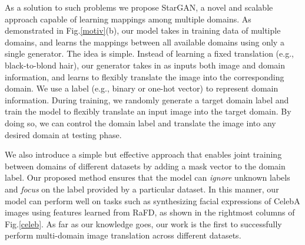 \documentclass[10pt,twocolumn,letterpaper]{article}
\begin{document}

As a solution to such problems we propose StarGAN, a novel and scalable approach capable of learning mappings among multiple domains. As demonstrated in Fig.\thinspace\ref{motiv}\thinspace(b), our model takes in training data of multiple domains, and learns the mappings between all available domains using only a single generator. The idea is simple. Instead of learning a fixed translation (e.g., black-to-blond hair), our generator takes in as inputs both image and domain information, and learns to flexibly translate the image into the corresponding domain. We use a label (e.g., binary or one-hot vector) to represent domain information. During training, we randomly generate a target domain label and train the model to flexibly translate an input image into the target domain. By doing so, we can control the domain label and translate the image into any desired domain at testing phase. %

We also introduce a simple but effective approach that enables joint training between domains of different datasets by adding a mask vector to the domain label. Our proposed method ensures that the model can \textit{ignore} unknown labels and \textit{focus} on the label provided by a particular dataset. In this manner, our model can perform well on tasks such as synthesizing facial expressions of CelebA images using features learned from RaFD, as shown in the rightmost columns of Fig.\thinspace\ref{celeb}. As far as our knowledge goes, our work is the first to successfully perform multi-domain image translation across different datasets.
\end{document}
